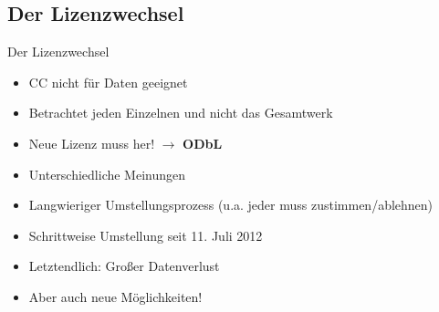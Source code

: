 \documentclass{beamer}
\begin{document}
\subsection{Der Lizenzwechsel}

\begin{frame}{Der Lizenzwechsel}
    \pause
    \begin{itemize}
        \item CC nicht für Daten geeignet
        \item Betrachtet jeden Einzelnen und nicht das Gesamtwerk
    \end{itemize}

    \pause

    \begin{itemize}
        \item Neue Lizenz muss her! $\rightarrow$ \textbf{ODbL}
    \end{itemize}

    \pause

    \begin{itemize}
        \item Unterschiedliche Meinungen
        \item Langwieriger Umstellungsprozess (u.a. jeder muss zustimmen/ablehnen)
        \item Schrittweise Umstellung seit 11. Juli 2012
    \end{itemize}

    \pause

    \begin{itemize}
        \item Letztendlich: Großer Datenverlust
        \item Aber auch neue Möglichkeiten!
    \end{itemize}
\end{frame}
\end{document}

